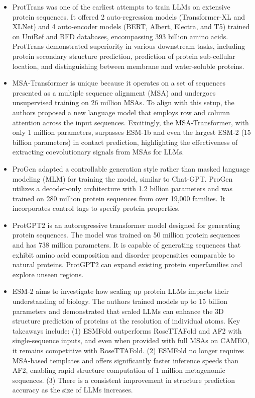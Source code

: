 \begin{itemize}
  \item ProtTrans was one of the earliest attempts to train LLMs on extensive protein sequences. \cite{Elnaggar2021ProtTrans} It offered 2 auto-regression models (Transformer-XL and XLNet) and 4 auto-encoder models (BERT, Albert, Electra, and T5) trained on UniRef and BFD databases, encompassing 393 billion amino acids. ProtTrans demonstrated superiority in various downstream tasks, including protein secondary structure prediction, prediction of protein sub-cellular location, and distinguishing between membrane and water-soluble proteins.
  \item MSA-Transformer is unique because it operates on a set of sequences presented as a multiple sequence alignment (MSA) and undergoes unsupervised training on 26 million MSAs. \cite{Rao2021MSATransformer} To align with this setup, the authors proposed a new language model that employs row and column attention across the input sequences. Excitingly, the MSA-Transformer, with only 1 million parameters, surpasses ESM-1b and even the largest ESM-2 (15 billion parameters) in contact prediction, highlighting the effectiveness of extracting coevolutionary signals from MSAs for LLMs.
  \item ProGen adapted a controllable generation style rather than masked language modeling (MLM) for training the model, similar to Chat-GPT. \cite{Madani2023} ProGen utilizes a decoder-only architecture with 1.2 billion parameters and was trained on 280 million protein sequences from over 19,000 families. It incorporates control tags to specify protein properties.
  \item ProtGPT2 is an autoregressive transformer model designed for generating protein sequences. \cite{Ferruz2022ProtGPT2} The model was trained on 50 million protein sequences and has 738 million parameters. It is capable of generating sequences that exhibit amino acid composition and disorder propensities comparable to natural proteins. ProtGPT2 can expand existing protein superfamilies and explore unseen regions.
  \item ESM-2 aims to investigate how scaling up protein LLMs impacts their understanding of biology. \cite{Lin2023ProteinStructure,lin2022language} The authors trained models up to 15 billion parameters and demonstrated that scaled LLMs can enhance the 3D structure prediction of proteins at the resolution of individual atoms. Key takeaways include: (1) ESMFold outperforms RoseTTAFold and AF2 with single-sequence inputs, and even when provided with full MSAs on CAMEO, it remains competitive with RoseTTAFold. (2) ESMFold no longer requires MSA-based templates and offers significantly faster inference speeds than AF2, enabling rapid structure computation of 1 million metagenomic sequences. (3) There is a consistent improvement in structure prediction accuracy as the size of LLMs increases.
\end{itemize}

